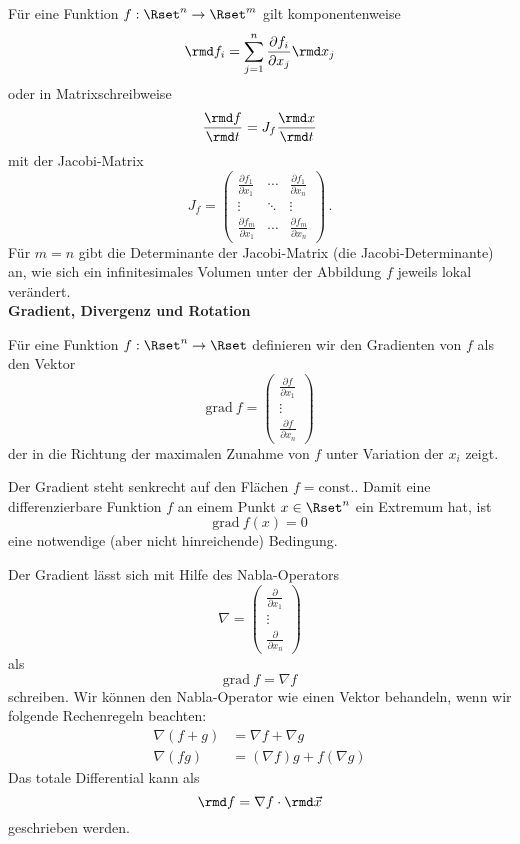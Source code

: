 \documentclass[a4paper,10pt]{article}
\begin{document}
Für eine Funktion $f:\Rset^n\to\Rset^m$ gilt komponentenweise
\[
\rmd f_i = \sum_{j=1}^n \frac{\partial f_i}{\partial x_j} \rmd x_j
\]
oder
in Matrixschreibweise
\[
\frac{\rmd f}{\rmd t}=J_f\frac{\rmd x}{\rmd t}
\]
mit der Jacobi-Matrix
\[
J_f=\left(\begin{array}{ccc}\frac{\partial f_1}{\partial x_1}&\cdots&\frac{\partial f_1}{\partial x_n}\\\vdots&\ddots&\vdots\\\frac{\partial f_m}{\partial x_1}&\cdots&\frac{\partial f_m}{\partial x_n}\end{array}\right)\,.
\]
Für $m=n$ gibt die Determinante der Jacobi-Matrix
(die Jacobi-Determinante)
an, wie sich ein infinitesimales Volumen unter der Abbildung $f$ jeweils
lokal verändert.
\\

{\bf Gradient, Divergenz und Rotation}

Für eine Funktion $f:\Rset^n\to\Rset$ definieren wir den Gradienten von $f$
als den Vektor
\[
{\mathrm{grad}}~f=\left(\begin{array}{c}\frac{\partial f}{\partial x_1}\\\vdots\\\frac{\partial f}{\partial x_n}\end{array}\right)
\]
der in die Richtung der maximalen Zunahme von $f$
unter Variation der $x_i$ zeigt.

Der Gradient steht senkrecht auf den Flächen $f={\mathrm{const.}}$.
Damit eine differenzierbare Funktion $f$ an einem Punkt $x\in\Rset^n$
ein Extremum hat, ist
\[
{\mathrm{grad}}~f(x)=0
\]
eine notwendige (aber nicht hinreichende) Bedingung.

Der Gradient lässt sich mit Hilfe des Nabla-Operators
\[
\nabla = \left(\begin{array}{c}\frac{\partial}{\partial x_1}\\\vdots\\\frac{\partial}{\partial x_n}\end{array}\right)
\]
als
\[
{\mathrm{grad}}~f=\nabla f
\]
schreiben.
Wir können den Nabla-Operator wie einen Vektor behandeln, wenn
wir folgende Rechenregeln beachten:
\begin{align*}
\nabla(f+g) &= \nabla f+\nabla g \\
\nabla(fg)  &= (\nabla f)g+f(\nabla g)
\end{align*}
Das totale Differential kann als
\[
\rmd f = \nabla f\cdot \rmd\vec{x}
\]
geschrieben werden.\\
\end{document}

